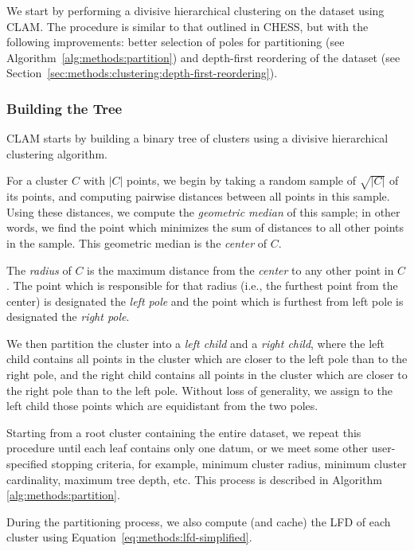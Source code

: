 We start by performing a divisive hierarchical clustering on the dataset using CLAM.
The procedure is similar to that outlined in CHESS, but with the following improvements:
better selection of poles for partitioning (see Algorithm~\ref{alg:methods:partition}) and depth-first reordering of the dataset (see Section~\ref{sec:methods:clustering:depth-first-reordering}).


\subsubsection{Building the Tree}
\label{sec:methods:clustering:building-the-tree}

CLAM starts by building a binary tree of clusters using a divisive hierarchical clustering algorithm.

For a cluster $C$ with $|C|$ points, we begin by taking a random sample of $\sqrt{|C|}$ of its points, and computing pairwise distances between all points in this sample.
Using these distances, we compute the \emph{geometric median} of this sample; in other words, we find the point which minimizes the sum of distances to all other points in the sample.
This geometric median is the \emph{center} of $C$.

The \emph{radius} of $C$ is the maximum distance from the \emph{center} to any other point in $C$.
The point which is responsible for that radius (i.e., the furthest point from the center) is designated the \emph{left pole} and the point which is furthest from left pole is designated the \emph{right pole}.

We then partition the cluster into a \emph{left child} and a \emph{right child}, where the left child contains all points in the cluster which are closer to the left pole than to the right pole, and the right child contains all points in the cluster which are closer to the right pole than to the left pole.
Without loss of generality, we assign to the left child those points which are equidistant from the two poles.

Starting from a root cluster containing the entire dataset, we repeat this procedure until each leaf contains only one datum, or we meet some other user-specified stopping criteria, for example, minimum cluster radius, minimum cluster cardinality, maximum tree depth, etc.
This process is described in Algorithm \ref{alg:methods:partition}.

During the partitioning process, we also compute (and cache) the LFD of each cluster using Equation~\ref{eq:methods:lfd-simplified}.

